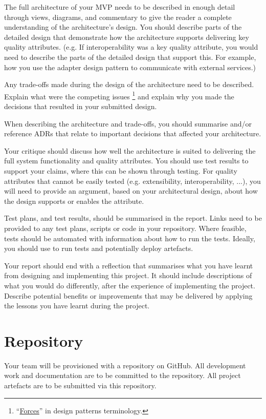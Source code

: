 \documentclass{csse4400}
\begin{document}
The full architecture of your MVP needs to be described in enough detail through views, diagrams, and commentary
to give the reader a complete understanding of the architecture's design.
You should describe parts of the detailed design that demonstrate how the architecture supports delivering key quality attributes.
(e.g. If interoperability was a key quality attribute, you would need to describe the parts of the detailed design that support this.
For example, how you use the adapter design pattern to communicate with external services.)

Any trade-offs made during the design of the architecture need to be described.
Explain what were the competing issues%
\footnote{``\href{http://www.cs.unc.edu/~stotts/COMP723-s15/patterns/forces.html}{Forces}'' in design patterns terminology.}
and explain why you made the decisions that resulted in your submitted design.

When describing the architecture and trade-offs,
you should summarise and/or reference ADRs that relate to important decisions that affected your architecture.

Your critique should discuss how well the architecture is suited to delivering the full system functionality and quality attributes.
You should use test results to support your claims, where this can be shown through testing.
For quality attributes that cannot be easily tested (e.g. extensibility, interoperability, ...),
you will need to provide an argument, based on your architectural design, about how the design supports or enables the attribute.

Test plans, and test results, should be summarised in the report.
Links need to be provided to any test plans, scripts or code in your repository.
Where feasible, tests should be automated with information about how to run the tests.
Ideally, you should use  to run tests and potentially deploy artefacts.

Your report should end with a reflection that summarises what you have learnt from designing and implementing this project.
It should include descriptions of what you would do differently, after the experience of implementing the project.
Describe potential benefits or improvements that may be delivered by applying the lessons you have learnt during the project.


\section{Repository}
Your team will be provisioned with a repository on GitHub.
All development work and documentation are to be committed to the repository.
All project artefacts are to be submitted via this repository.
\end{document}

